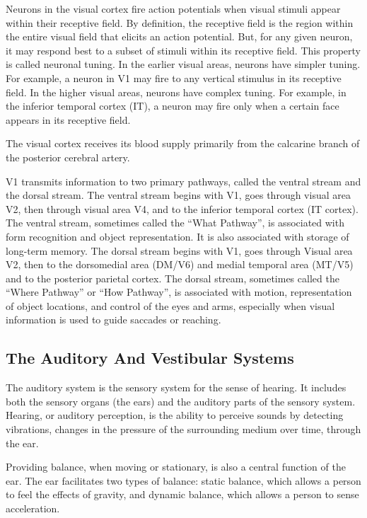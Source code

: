 Neurons in the visual cortex fire action potentials when visual stimuli
appear within their receptive field. By definition, the receptive field
is the region within the entire visual field that elicits an action
potential. But, for any given neuron, it may respond best to a subset of
stimuli within its receptive field. This property is called neuronal
tuning. In the earlier visual areas, neurons have simpler tuning. For
example, a neuron in V1 may fire to any vertical stimulus in its
receptive field. In the higher visual areas, neurons have complex
tuning. For example, in the inferior temporal cortex (IT), a neuron may
fire only when a certain face appears in its receptive field.

The visual cortex receives its blood supply primarily from the calcarine
branch of the posterior cerebral artery.

V1 transmits information to two primary pathways, called the ventral
stream and the dorsal stream. The ventral stream begins with V1, goes
through visual area V2, then through visual area V4, and to the inferior
temporal cortex (IT cortex). The ventral stream, sometimes called the
``What Pathway'', is associated with form recognition and object
representation. It is also associated with storage of long-term memory.
The dorsal stream begins with V1, goes through Visual area V2, then to
the dorsomedial area (DM/V6) and medial temporal area (MT/V5) and to the
posterior parietal cortex. The dorsal stream, sometimes called the
``Where Pathway'' or ``How Pathway'', is associated with motion,
representation of object locations, and control of the eyes and arms,
especially when visual information is used to guide saccades or
reaching.

\hypertarget{the-auditory-and-vestibular-systems}{%
\subsection{The Auditory And Vestibular
Systems}\label{the-auditory-and-vestibular-systems}}

The auditory system is the sensory system for the sense of hearing. It
includes both the sensory organs (the ears) and the auditory parts of
the sensory system. Hearing, or auditory perception, is the ability to
perceive sounds by detecting vibrations, changes in the pressure of the
surrounding medium over time, through the ear.

Providing balance, when moving or stationary, is also a central function
of the ear. The ear facilitates two types of balance: static balance,
which allows a person to feel the effects of gravity, and dynamic
balance, which allows a person to sense acceleration.

